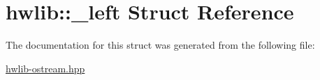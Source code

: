 \hypertarget{structhwlib_1_1__left}{}\section{hwlib\+:\+:\+\_\+left Struct Reference}
\label{structhwlib_1_1__left}


The documentation for this struct was generated from the following file\+:\begin{DoxyCompactItemize}
\item 
\hyperlink{hwlib-ostream_8hpp}{hwlib-\/ostream.\+hpp}\end{DoxyCompactItemize}
